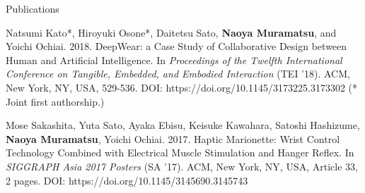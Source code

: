 \documentclass{resume} %
\begin{document}
\begin{rSection}{Publications}
\item Natsumi Kato*, Hiroyuki Osone*, Daitetsu Sato, \textbf{Naoya Muramatsu}, and Yoichi Ochiai. 2018. DeepWear: a Case Study of Collaborative Design between Human and Artificial Intelligence. In \textit{Proceedings of the Twelfth International Conference on Tangible, Embedded, and Embodied Interaction} (TEI ’18). ACM, New York, NY, USA, 529-536. DOI: https://doi.org/10.1145/3173225.3173302 (* Joint first authorship.)
\item Mose Sakashita, Yuta Sato, Ayaka Ebisu, Keisuke Kawahara, Satoshi Hashizume, \textbf{Naoya Muramatsu}, Yoichi Ochiai. 2017. Haptic Marionette: Wrist Control Technology Combined with Electrical Muscle Stimulation and Hanger Reflex. In \textit{SIGGRAPH Asia 2017 Posters} (SA '17). ACM, New York, NY, USA, Article 33, 2 pages. DOI: https://doi.org/10.1145/3145690.3145743


\end{rSection}
\end{document}
